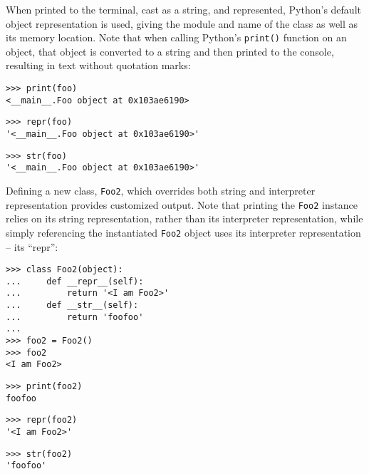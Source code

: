 \noindent When printed to the terminal, cast as a string, and represented,
Python's default object representation is used, giving the module and name of
the class as well as its memory location. Note that when calling Python's
\texttt{print()} function on an object, that object is converted to a string
and then printed to the console, resulting in text without quotation marks:

\begin{comment}
<abjad>
print(foo)
repr(foo)
str(foo)
</abjad>
\end{comment}

\begin{abjadbookoutput}
\begin{singlespacing}
\vspace{-0.5\baselineskip}
\begin{verbatim}
>>> print(foo)
<__main__.Foo object at 0x103ae6190>
\end{verbatim}
\begin{verbatim}
>>> repr(foo)
'<__main__.Foo object at 0x103ae6190>'
\end{verbatim}
\begin{verbatim}
>>> str(foo)
'<__main__.Foo object at 0x103ae6190>'
\end{verbatim}
\end{singlespacing}
\end{abjadbookoutput}

\noindent Defining a new class, \texttt{Foo2}, which overrides both string and
interpreter representation provides customized output. Note that printing the
\texttt{Foo2} instance relies on its string representation, rather than its
interpreter representation, while simply referencing the instantiated
\texttt{Foo2} object uses its interpreter representation -- its \enquote{repr}:

\begin{comment}
<abjad>
class Foo2(object):
    def __repr__(self):
        return '<I am Foo2>'
    def __str__(self):
        return 'foofoo'

foo2 = Foo2()
foo2
print(foo2)
repr(foo2)
str(foo2)
</abjad>
\end{comment}

\begin{abjadbookoutput}
\begin{singlespacing}
\vspace{-0.5\baselineskip}
\begin{verbatim}
>>> class Foo2(object):
...     def __repr__(self):
...         return '<I am Foo2>'
...     def __str__(self):
...         return 'foofoo'
...
>>> foo2 = Foo2()
>>> foo2
<I am Foo2>
\end{verbatim}
\begin{verbatim}
>>> print(foo2)
foofoo
\end{verbatim}
\begin{verbatim}
>>> repr(foo2)
'<I am Foo2>'
\end{verbatim}
\begin{verbatim}
>>> str(foo2)
'foofoo'
\end{verbatim}
\end{singlespacing}
\end{abjadbookoutput}

